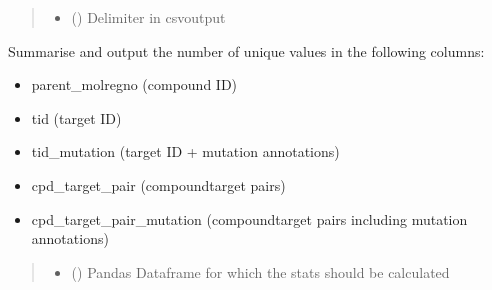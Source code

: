 \documentclass[letterpaper,10pt,english]{sphinxmanual}
\begin{document}
\begin{fulllineitems}
\begin{quote}
\begin{description}
\begin{itemize}
\item {} 
\sphinxAtStartPar
{} () \textendash{} Delimiter in csv\sphinxhyphen{}output

\end{itemize}

\end{description}\end{quote}

\end{fulllineitems}


\begin{fulllineitems}
\label{\detokenize{get_stats:get_stats.output_stats}}
\pysigstartsignatures
{}
\pysigstopsignatures
\sphinxAtStartPar
Summarise and output the number of unique values in the following columns:
\begin{itemize}
\item {} 
\sphinxAtStartPar
parent\_molregno (compound ID)

\item {} 
\sphinxAtStartPar
tid (target ID)

\item {} 
\sphinxAtStartPar
tid\_mutation (target ID + mutation annotations)

\item {} 
\sphinxAtStartPar
cpd\_target\_pair (compound\sphinxhyphen{}target pairs)

\item {} 
\sphinxAtStartPar
cpd\_target\_pair\_mutation (compound\sphinxhyphen{}target pairs including mutation annotations)

\end{itemize}
\begin{quote}\begin{description}
\begin{itemize}
\item {} 
\sphinxAtStartPar
{} () \textendash{} Pandas Dataframe for which the stats should be calculated


\end{itemize}
\end{description}
\end{quote}
\end{fulllineitems}
\end{document}
